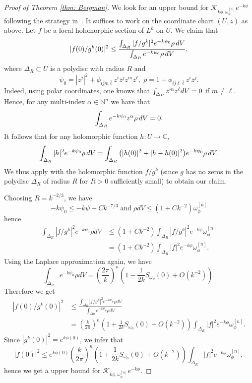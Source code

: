 \documentclass[a4paper, 11pt]{amsart}
\theoremstyle{plain}
\numberwithin{equation}{section} %
\numberwithin{figure}{section} %
\theoremstyle{plain}
\theoremstyle{plain}
\theoremstyle{plain}
\theoremstyle{plain}
\theoremstyle{remark}
\theoremstyle{definition}
\theoremstyle{definition}
\newcommand{\K}{\mathcal{K}}
\begin{document}
\begin{proof}[Proof of Theorem \ref{thm: Bergman}]
\medskip
We look for an upper bound for $\K_{k\phi,\omega_\phi^{[n]}}e^{-k\phi}$ following the strategy in~\cite{charles15-bergmankernel}.  It suffices to work on the coordinate chart $(U,z)$ as above. 
Let $f$ be a local holomorphic section of $L^k$ on $U$. 
We claim that
\begin{equation*}
|f(0)/g^k(0)|^2\leq \frac{\int_{\Delta_R} |f/g^{k}|^2e^{-k\psi_0 }  \rho \,{\rm d}V}{\int_{\Delta_R}e^{-k\psi_0}\rho\, {\rm d}V},
\end{equation*}
where $\Delta_R\subset U$ is a polydisc with radius $R$ and
$$\psi_0= |z^j|^2+\phi_{i\bar j m\bar \ell} z^i \bar z^{j} z^{m}\bar z^{ \ell},\; \rho=1+ \phi_{ i \bar j \ell\bar \ell}z^i\bar z^j.$$ 
{Indeed, using polar coordinates, one knows that $\int_{\Delta_R}z^m\Bar z^\ell dV=0$ if $m\neq \ell$. Hence, for any multi-index $\alpha\in\mathbb{N}^n$ we have that \[\int_{\Delta_R}e^{-k\psi_0}z^\alpha  \rho \,{\rm d}V=0.\] It follows that for any holomorphic function $h: U\to\mathbb{C}$,
\[ \int_{\Delta_R}|h|^2 e^{-k\psi_0}\rho \,{\rm d}V=\int_{\Delta_R}\big(|h(0)|^2+|h-h(0)|^2 \big) e^{-k\psi_0}\rho \,{\rm d}V
. \] We thus apply with the holomorphic function $f/g^k$ (since $g$ has no zeros in the polydisc $\Delta_R$ of radius $R$ for $R>0$ sufficiently small) to obtain our claim.}

Choosing $R=k^{-2/3}$,
we have $$-k\psi_0\leq -k\psi + Ck^{-7/3} \;
\text{and}\; 
\rho dV\leq (1+Ck^{-2} )\omega_\phi^{[n]} $$
hence
\begin{align*}
\int_{\Delta_R} |f/g^k|^2e^{-k\psi_0 } \rho dV&\leq  (1+ Ck^{-2}) \int _{\Delta_R}  |f/g^k|^2e^{-k\psi}\omega_\phi^{[n]}\\
&=(1+ Ck^{-2}) \int _{\Delta_R}  |f|^2e^{-k\phi} \omega_\phi^{[n]}.
\end{align*}
Using the Laplace approximation again, we have 
\begin{equation*}
\int_{\Delta_R}e^{-k\psi_0}\rho dV= \left(\frac{2\pi}{k}\right)^n\left( 1- \frac{1}{2k} S_{\omega_\phi}(0)  + O(k^{-2}) \right).
\end{equation*}
Therefore we get
\begin{align*}
|f(0)/g^k(0)|^2&\leq \frac{\int_{\Delta_R} |f/g^k|^2e^{-k\psi_0 }\rho dV}{\int_{\Delta_R}e^{-k\psi_0}\rho dV} \\ \nonumber
&=\left(\frac{k}{2\pi}\right)^n \left( 1+ \frac{1}{2k} S_{\omega_\phi}(0)  + O( k^{-2}) \right)\int _{\Delta_R}  |f|^2e^{-k\phi} \omega_\phi^{[n]}.
\end{align*}
Since $|g^k(0)|^2=e^{k\phi(0)}$, we infer that
$$ |f(0)|^2\leq e^{k\phi(0)}\left(\frac{k}{2\pi}\right)^n \left( 1+ \frac{1}{2k} S_{\omega_\phi}(0)  + O( k^{-2}) \right)\int _{\Delta_R}  |f|^2e^{-k\phi} \omega_\phi^{[n]},$$
hence we get a upper bound for $\K_{k\phi,\omega_\phi^{[n]}}e^{-k\phi}$.
\end{proof}
\end{document}
